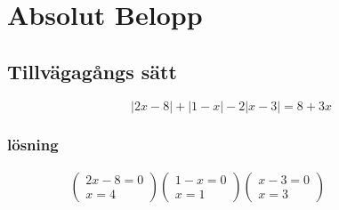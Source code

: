 \newpage
\section{Absolut Belopp}
\subsection{Tillvägagångs sätt}
\begin{equation}
| 2 x - 8 | + | 1 - x | - 2 | x - 3 | = 8 + 3 x
\end{equation}


\subsubsection{lösning}
\begin{align*}
\left( \begin{array} { c } { 2 x - 8 = 0 } \\ { x = 4 } \end{array} \right)
\left( \begin{array} { c } { 1 - x = 0 } \\ { x = 1 } \end{array} \right)
\left( \begin{array} { c } { x - 3 = 0 } \\ { x = 3 } \end{array} \right)
&\quad
&\quad
&\quad
\end{align*}


